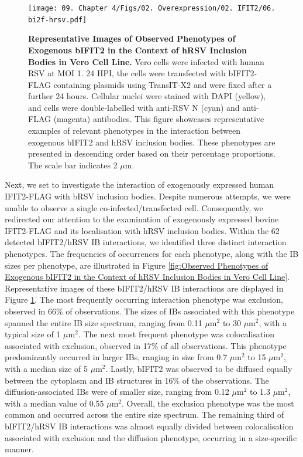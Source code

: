 \begin{figure}
    \centering
    \texttt{[image: 09. Chapter 4/Figs/02. Overexpression/02. IFIT2/06. bi2f-hrsv.pdf]}
    \caption[Representative Images of Observed Phenotypes of Exogenous bIFIT2 in the Context of hRSV Inclusion Bodies in Vero Cell Line.]{\textbf{Representative Images of Observed Phenotypes of Exogenous bIFIT2 in the Context of hRSV Inclusion Bodies in Vero Cell Line.} Vero cells were infected with human RSV at MOI 1. 24 HPI, the cells were transfected with bIFIT2-FLAG containing plasmids using TransIT-X2 and were fixed after a further 24 hours. Cellular nuclei were stained with DAPI (yellow), and cells were double-labelled with anti-RSV N (cyan) and anti-FLAG (magenta) antibodies. This figure showcases representative examples of relevant phenotypes in the interaction between exogenous bIFIT2 and hRSV inclusion bodies. These phenotypes are presented in descending order based on their percentage proportions. The scale bar indicates 2 \(\mu \mbox{m}\).}
    \label{fig:Representative Images of Observed Phenotypes of Exogenous bIFIT2 in the Context of hRSV Inclusion Bodies in Vero Cell Line}
\end{figure}

Next, we set to investigate the interaction of exogenously expressed human IFIT2-FLAG with bRSV inclusion bodies. Despite numerous attempts, we were unable to observe a single co-infected/transfected cell. Consequently, we redirected our attention to the examination of exogenously expressed bovine IFIT2-FLAG and its localisation with hRSV inclusion bodies. Within the 62 detected bIFIT2/hRSV IB interactions, we identified three distinct interaction phenotypes. The frequencies of occurrences for each phenotype, along with the IB sizes per phenotype, are illustrated in Figure \ref{fig:Observed Phenotypes of Exogenous bIFIT2 in the Context of hRSV Inclusion Bodies in Vero Cell Line}. Representative images of these bIFIT2/hRSV IB interactions are displayed in Figure \ref{fig:Representative Images of Observed Phenotypes of Exogenous bIFIT2 in the Context of hRSV Inclusion Bodies in Vero Cell Line}. The most frequently occurring interaction phenotype was exclusion, observed in 66\% of observations. The sizes of IBs associated with this phenotype spanned the entire IB size spectrum, ranging from 0.11 $\mu \mbox{m}^2$ to 30 $\mu \mbox{m}^2$, with a typical size of 1 $\mu \mbox{m}^2$. The next most frequent phenotype was colocalisation associated with exclusion, observed in 17\% of all observations. This phenotype predominantly occurred in larger IBs, ranging in size from 0.7 $\mu \mbox{m}^2$ to 15 $\mu \mbox{m}^2$, with a median size of 5 $\mu \mbox{m}^2$. Lastly, bIFIT2 was observed to be diffused equally between the cytoplasm and IB structures in 16\% of the observations. The diffusion-associated IBs were of smaller size, ranging from 0.12 $\mu \mbox{m}^2$ to 1.3 $\mu \mbox{m}^2$, with a median value of 0.55 $\mu \mbox{m}^2$. Overall, the exclusion phenotype was the most common and occurred across the entire size spectrum. The remaining third of bIFIT2/hRSV IB interactions was almost equally divided between colocalisation associated with exclusion and the diffusion phenotype, occurring in a size-specific manner.

